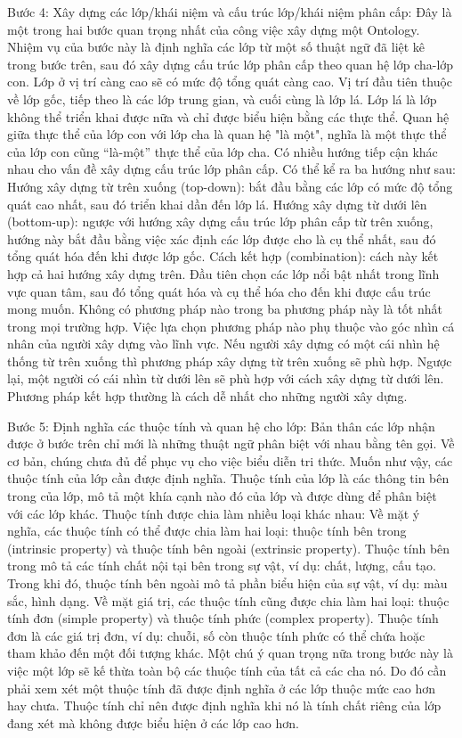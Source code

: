 Bước 4: Xây dựng các lớp/khái niệm và cấu trúc lớp/khái niệm phân cấp:
Đây là một trong hai bước quan trọng nhất của công việc xây dựng một Ontology. Nhiệm vụ của bước này là định nghĩa các lớp từ một số thuật ngữ đã liệt kê trong bước trên, sau đó xây dựng cấu trúc lớp phân cấp theo quan hệ lớp cha-lớp con. Lớp ở vị trí càng cao sẽ có mức độ tổng quát càng cao. Vị trí đầu tiên thuộc về lớp gốc, tiếp theo là các lớp trung gian, và cuối cùng là lớp lá. Lớp lá là lớp không thể triển khai được nữa và chỉ được biểu hiện bằng các thực thể. Quan hệ giữa thực thể của lớp con với lớp cha là quan hệ "là một", nghĩa là một thực thể của lớp con cũng “là-một” thực thể của lớp cha. Có nhiều hướng tiếp cận khác nhau cho vấn đề
xây dựng cấu trúc lớp phân cấp. Có thể kể ra ba hướng như sau: 
Hướng xây dựng từ trên xuống (top-down): bắt đầu bằng các lớp có mức độ tổng quát cao nhất, sau đó triển khai dần đến lớp lá.
Hướng xây dựng từ dưới lên (bottom-up): ngược với hướng xây dựng cấu trúc lớp phân cấp từ trên xuống, hướng này bắt đầu bằng việc xác định các lớp được cho là cụ thể nhất, sau đó tổng quát hóa đến khi được lớp gốc.
Cách kết hợp (combination): cách này kết hợp cả hai hướng xây dựng trên. Đầu tiên chọn các lớp nổi bật nhất trong lĩnh vực quan tâm, sau đó tổng quát hóa và cụ thể hóa cho đến khi được cấu trúc mong muốn. 
Không có phương pháp nào trong ba phương pháp này là tốt nhất trong mọi trường hợp. Việc lựa chọn phương pháp nào phụ thuộc vào góc nhìn cá nhân của người xây dựng vào lĩnh vực. Nếu người xây dựng có một cái nhìn hệ thống từ trên xuống thì phương pháp xây dựng từ trên xuống sẽ phù hợp. Ngược lại, một người có cái nhìn từ dưới lên sẽ phù hợp với cách xây dựng từ dưới lên. Phương pháp kết hợp thường là cách dễ nhất cho những người xây dựng. 

Bước 5: Định nghĩa các thuộc tính và quan hệ cho lớp:
Bản thân các lớp nhận được ở bước trên chỉ mới là những thuật ngữ phân biệt với nhau bằng tên gọi. Về cơ bản, chúng chưa đủ để phục vụ cho việc biểu diễn tri thức. Muốn như vậy, các thuộc tính của lớp cần được định nghĩa. Thuộc tính của lớp là các thông tin bên trong của lớp, mô tả một khía cạnh nào đó của lớp và được dùng để phân biệt với các lớp khác. Thuộc tính được chia làm nhiều loại khác nhau:
Về mặt ý nghĩa, các thuộc tính có thể được chia làm hai loại: thuộc tính bên trong
(intrinsic property) và thuộc tính bên ngoài (extrinsic property). Thuộc tính bên trong mô tả các tính chất nội tại bên trong sự vật, ví dụ: chất, lượng, cấu tạo. Trong khi đó, thuộc tính bên ngoài mô tả phần biểu hiện của sự vật, ví dụ: màu sắc, hình dạng. Về mặt giá trị, các thuộc tính cũng được chia làm hai loại: thuộc tính đơn (simple property) và thuộc tính phức (complex property). Thuộc tính đơn là các giá trị đơn, ví dụ: chuỗi, số còn thuộc tính phức có thể chứa hoặc tham khảo đến một đối tượng khác. Một chú ý quan trọng nữa trong bước này là việc một lớp sẽ kế thừa toàn bộ các thuộc tính của tất cả các cha nó. Do đó cần phải xem xét một thuộc tính đã được định nghĩa ở các lớp thuộc mức cao hơn hay chưa. Thuộc tính chỉ nên được định nghĩa khi nó là tính chất riêng của lớp đang xét mà không được biểu hiện ở các lớp cao hơn. 

